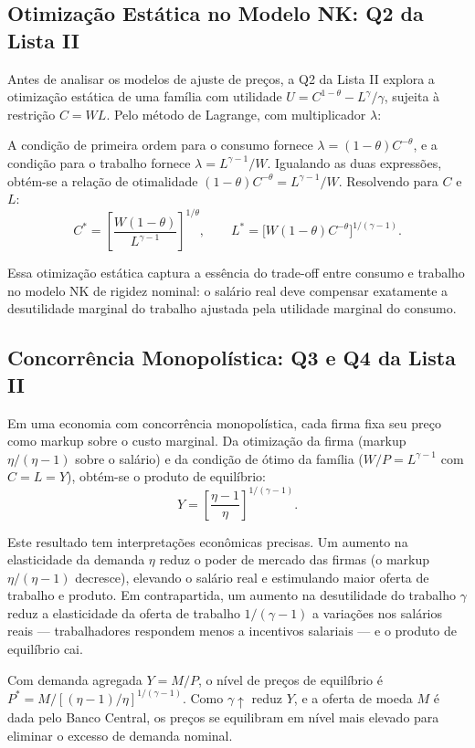 \documentclass[12pt, a4paper]{article}
\begin{document}
\subsection{Otimização Estática no Modelo NK: Q2 da Lista II}

Antes de analisar os modelos de ajuste de preços, a Q2 da Lista II explora a otimização estática de uma família com utilidade $U = C^{1-\theta} - L^\gamma/\gamma$, sujeita à restrição $C = WL$. Pelo método de Lagrange, com multiplicador $\lambda$:

A condição de primeira ordem para o consumo fornece $\lambda = (1-\theta)C^{-\theta}$, e a condição para o trabalho fornece $\lambda = L^{\gamma-1}/W$. Igualando as duas expressões, obtém-se a relação de otimalidade $(1-\theta)C^{-\theta} = L^{\gamma-1}/W$. Resolvendo para $C$ e $L$:
\[
C^* = \left[\frac{W(1-\theta)}{L^{\gamma-1}}\right]^{1/\theta}, \qquad L^* = \bigl[W(1-\theta)C^{-\theta}\bigr]^{1/(\gamma-1)}.
\]

Essa otimização estática captura a essência do trade-off entre consumo e trabalho no modelo NK de rigidez nominal: o salário real deve compensar exatamente a desutilidade marginal do trabalho ajustada pela utilidade marginal do consumo.

\subsection{Concorrência Monopolística: Q3 e Q4 da Lista II}

Em uma economia com concorrência monopolística, cada firma fixa seu preço como markup sobre o custo marginal. Da otimização da firma (markup $\eta/(\eta-1)$ sobre o salário) e da condição de ótimo da família ($W/P = L^{\gamma-1}$ com $C = L = Y$), obtém-se o produto de equilíbrio:
\[
Y = \left[\frac{\eta-1}{\eta}\right]^{1/(\gamma-1)}.
\]

Este resultado tem interpretações econômicas precisas. Um aumento na elasticidade da demanda $\eta$ reduz o poder de mercado das firmas (o markup $\eta/(\eta-1)$ decresce), elevando o salário real e estimulando maior oferta de trabalho e produto. Em contrapartida, um aumento na desutilidade do trabalho $\gamma$ reduz a elasticidade da oferta de trabalho $1/(\gamma-1)$ a variações nos salários reais — trabalhadores respondem menos a incentivos salariais — e o produto de equilíbrio cai.

Com demanda agregada $Y = M/P$, o nível de preços de equilíbrio é $P^* = M/[(\eta-1)/\eta]^{1/(\gamma-1)}$. Como $\gamma\uparrow$ reduz $Y$, e a oferta de moeda $M$ é dada pelo Banco Central, os preços se equilibram em nível mais elevado para eliminar o excesso de demanda nominal.
\end{document}
